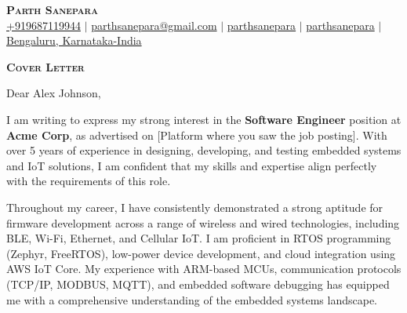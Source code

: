\documentclass[letterpaper,11pt]{article}
\newcommand{\CompanyName}{Acme Corp}
\newcommand{\Position}{Software Engineer}
\newcommand{\HiringManager}{Alex Johnson}
\begin{document}
\begin{center}
    \textbf{\Huge \scshape Parth Sanepara} \\ \vspace{3pt}
    \small
    \faMobile \hspace{.5pt} \href{tel:9687119944}{+919687119944}
    $|$
    \faAt \hspace{.5pt} \href{mailto:parthsanepara@gmail.com}{parthsanepara@gmail.com}
    $|$
    \faLinkedinSquare \hspace{.5pt} \href{https://www.linkedin.com/in/parthsanepara}{parthsanepara}
    $|$
    \faGithub \hspace{.5pt} \href{https://github.com/parthsanepara}{parthsanepara}
    $|$
    \faMapMarker \hspace{.5pt} \href{https://maps.app.goo.gl/cc5ibm6jAiXmRFp17}{Bengaluru, Karnataka-India}
\end{center}

\vspace{1cm}

\begin{center}
    \textbf{\Large \scshape Cover Letter} \\ \vspace{3pt}
\end{center}

\vspace{0.5cm}

  Dear \HiringManager{},\\ \vspace{3pt}

  I am writing to express my strong interest in the \textbf{\Position{}} position at \textbf{\CompanyName{}}, 
  as advertised on [Platform where you saw the job posting]. With over 5 years of experience in designing, developing,
  and testing embedded systems and IoT solutions, I am confident that my skills and expertise align perfectly with the 
  requirements of this role. \\ \vspace{3pt}

  Throughout my career, I have consistently demonstrated a strong aptitude for firmware development across a range of 
  wireless and wired technologies, including BLE, Wi-Fi, Ethernet, and Cellular IoT. I am proficient in RTOS programming 
  (Zephyr, FreeRTOS), low-power device development, and cloud integration using AWS IoT Core. My experience with ARM-based MCUs, 
  communication protocols (TCP/IP, MODBUS, MQTT), and embedded software debugging has equipped me with a comprehensive 
  understanding of the embedded systems landscape. \\ \vspace{3pt}
\end{document}
